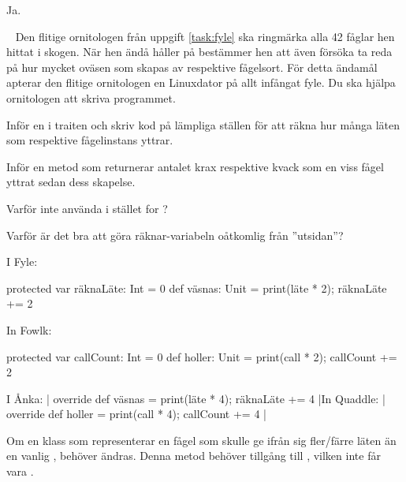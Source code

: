 \SubtaskSolved  Ja.


\QUESTEND







\QUESTBEGIN

\Task  \what~  Den flitige ornitologen från uppgift \ref{task:fyle} ska ringmärka alla 42 fåglar hen hittat i skogen. När hen ändå håller på bestämmer hen att även försöka ta reda på hur mycket oväsen som skapas av respektive fågelsort. För detta ändamål apterar den flitige ornitologen en Linuxdator på allt infångat fyle. Du ska hjälpa ornitologen att skriva programmet.

\Subtask Inför en \ifswedish{}\else{}\fi{} i traiten \ifswedish{}\else{}\fi{} och skriv kod på lämpliga ställen för att räkna hur många läten som respektive fågelinstans yttrar.

\Subtask Inför en metod \ifswedish{}\else{}\fi{} som returnerar antalet krax respektive kvack som en viss fågel yttrat sedan dess skapelse.

\Subtask Varför inte använda  i stället for ?

\Subtask Varför är det bra att göra räknar-variabeln oåtkomlig från ''utsidan''?



\SOLUTION


\TaskSolved \what


\SubtaskSolved  \ifswedish I Fyle:
\begin{Code}
protected var räknaLäte: Int = 0
def väsnas: Unit = { print(läte * 2); räknaLäte += 2 }
\end{Code}
\else In Fowlk:
\begin{Code}
protected var callCount: Int = 0
def holler: Unit = { print(call * 2); callCount += 2 }
\end{Code}
\fi

\ifswedish I Ånka: \code| override def väsnas = { print(läte * 4); räknaLäte += 4 }|\else In Quaddle: \code| override def holler = { print(call * 4); callCount += 4 }|\fi

\SubtaskSolved  \ifswedish{}\else{}\fi

\SubtaskSolved  Om en klass som representerar en fågel som skulle ge ifrån sig fler/färre läten än en vanlig \ifswedish{}\else{}\fi{}, behöver \ifswedish{}\else{}\fi{} ändras. Denna metod behöver tillgång till \ifswedish{}\else{}\fi{}, vilken inte får vara .

